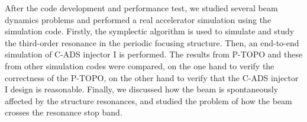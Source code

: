 After the code development and performance test, we studied several beam dynamics problems 
and performed a real accelerator simulation using the simulation code.
Firstly, the symplectic algorithm is used to simulate and study the third-order resonance in the periodic focusing structure.
Then, an end-to-end simulation of C-ADS injector I is performed.
The results from P-TOPO and these from other simulation codes were compared, on the one hand to verify the correctness of the P-TOPO, on the other hand to verify that the C-ADS injector I design is reasonable.
Finally, we discussed how the beam is spontaneously affected by the structure resonances, 
and studied the problem of how the beam crosses the resonance stop band.



